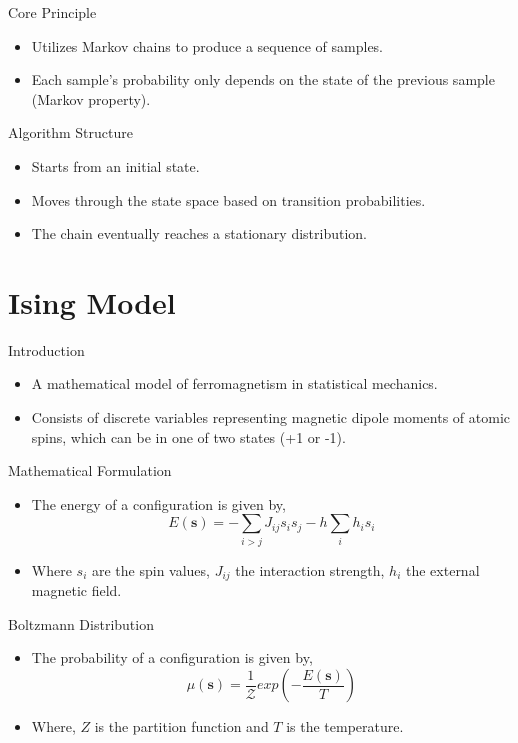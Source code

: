 \documentclass[
    10pt,
    aspectratio=169,
]{beamer}
\begin{document}
\begin{frame}{Core Principle}
    \begin{itemize}
        \item Utilizes Markov chains to produce a sequence of samples.
        \item Each sample's probability only depends on the state of the previous sample (Markov property).
    \end{itemize}
\end{frame}

\begin{frame}{Algorithm Structure}
    \begin{itemize}
        \item Starts from an initial state.
        \item Moves through the state space based on transition probabilities.
        \item The chain eventually reaches a stationary distribution.
    \end{itemize}
\end{frame}

\section{Ising Model}
\begin{frame}{Introduction}
    \begin{itemize}
        \item A mathematical model of ferromagnetism in statistical mechanics.
        \item Consists of discrete variables representing magnetic dipole moments of atomic spins, which can be in one of two states (+1 or -1).
    \end{itemize}
\end{frame}

\begin{frame}{Mathematical Formulation}
    \begin{itemize}
        \item The energy of a configuration is given by,
              \[ E(\mathbf{s}) = - \sum_{i>j}J_{ij} s_i s_j - h \sum_i h_is_i \]
        \item Where \( s_i \) are the spin values, \( J_{ij} \) the interaction strength, \( h_i \) the external magnetic field.
    \end{itemize}
\end{frame}

\begin{frame}{Boltzmann Distribution}
    \begin{itemize}
        \item The probability of a configuration is given by,
              \[ \mu(\mathbf{s}) = \frac{1}{\mathcal{Z}} exp{\left(- \frac{E(\mathbf{s})}{T}\right)} \]
        \item Where, \( Z \) is the partition function and \( T \) is the temperature.
    \end{itemize}
\end{frame}
\end{document}
